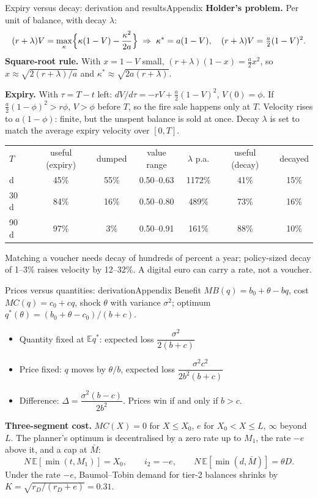 \documentclass[aspectratio=169,9pt]{beamer}
\begin{document}
\begin{frame}{Expiry versus decay: derivation and results}{Appendix}
  \footnotesize
  \textbf{Holder's problem.} Per unit of balance, with decay $\lambda$:
  \[
    (r+\lambda)V = \max_{\kappa}\Bigl\{\kappa(1-V) - \frac{\kappa^2}{2a}\Bigr\}
    \;\Rightarrow\; \kappa^*=a(1-V),\quad (r+\lambda)V=\tfrac a2(1-V)^2 .
  \]
  \textbf{Square-root rule.} With $x=1-V$ small, $(r+\lambda)(1-x)=\tfrac a2 x^2$, so $x\approx\sqrt{2(r+\lambda)/a}$ and $\kappa^*\approx\sqrt{2a(r+\lambda)}$.

  \textbf{Expiry.} With $\tau=T-t$ left: $dV/d\tau=-rV+\tfrac a2(1-V)^2$, $V(0)=\phi$. If $\tfrac a2(1-\phi)^2>r\phi$, $V>\phi$ before $T$, so the fire sale happens only at $T$.
  Velocity rises to $a(1-\phi)$: finite, but the unspent balance is sold at once. Decay $\lambda$ is set to match the average expiry velocity over $[0,T]$.

  \vspace{0.4em}
  \begin{tabular}{@{}lcccccc@{}}
    $T$ & useful (expiry) & dumped & value range & $\lambda$ p.a. & useful (decay) & decayed \\
    \arrayrulecolor{hair}\midrule
    7 d  & 45\% & 55\% & 0.50--0.63 & 1172\% & 41\% & 15\% \\
    30 d & 84\% & 16\% & 0.50--0.80 & 489\%  & 73\% & 16\% \\
    90 d & 97\% & 3\%  & 0.50--0.91 & 161\%  & 88\% & 10\% \\
  \end{tabular}

  \vspace{0.4em}
  Matching a voucher needs decay of hundreds of percent a year; policy-sized decay of 1--3\% raises velocity by 12--32\%. A digital euro can carry a rate, not a voucher.
\end{frame}

\begin{frame}{Prices versus quantities: derivation}{Appendix}
  \footnotesize
  Benefit $MB(q)=b_0+\theta-bq$, cost $MC(q)=c_0+cq$, shock $\theta$ with variance $\sigma^2$; optimum $q^*(\theta)=(b_0+\theta-c_0)/(b+c)$.
  \begin{itemize}
    \setlength\itemsep{0.4em}
    \item Quantity fixed at $\mathbb E q^*$: expected loss $\dfrac{\sigma^2}{2(b+c)}$
    \item Price fixed: $q$ moves by $\theta/b$, expected loss $\dfrac{\sigma^2 c^2}{2b^2(b+c)}$
    \item Difference: $\Delta=\dfrac{\sigma^2(b-c)}{2b^2}$. Prices win if and only if $b>c$.
  \end{itemize}
  \vspace{0.5em}
  \textbf{Three-segment cost.} $MC(X)=0$ for $X\le X_0$, $e$ for $X_0<X\le L$, $\infty$ beyond $L$.
  The planner's optimum is decentralised by a zero rate up to $M_1$, the rate $-e$ above it, and a cap at $\bar M$:
  \[
    N\,\mathbb E[\min(t,M_1)]=X_0,\qquad i_2=-e,\qquad N\,\mathbb E[\min(d,\bar M)]=\theta D .
  \]
  Under the rate $-e$, Baumol--Tobin demand for tier-2 balances shrinks by $K=\sqrt{r_D/(r_D+e)}=0.31$.
\end{frame}
\end{document}
